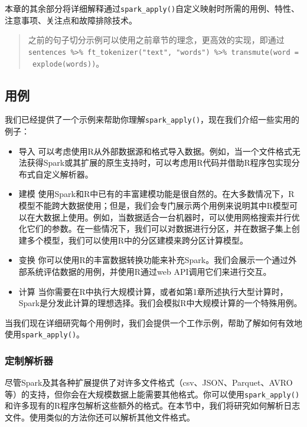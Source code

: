 \documentclass[
]{article}
\providecommand{\tightlist}{%
  \setlength{\itemsep}{0pt}\setlength{\parskip}{0pt}}
\begin{document}
本章的其余部分将详细解释通过\texttt{spark\_apply()}自定义映射时所需的用例、特性、注意事项、关注点和故障排除技术。

\begin{quote}
之前的句子切分示例可以使用之前章节的理念，更高效的实现，即通过\texttt{sentences\ \%\textgreater{}\%\ ft\_tokenizer("text",\ "words")\ \%\textgreater{}\%\ transmute(word\ =\ explode(words))}。
\end{quote}

\hypertarget{ux7528ux4f8b-1}{%
\subsection{用例}\label{ux7528ux4f8b-1}}

我们已经提供了一个示例来帮助你理解\texttt{spark\_apply()}，现在我们介绍一些实用的例子：

\begin{itemize}
\tightlist
\item
  导入
  可以考虑使用R从外部数据源和格式导入数据。例如，当一个文件格式无法获得Spark或其扩展的原生支持时，可以考虑用R代码并借助R程序包实现分布式自定义解析器。
\item
  建模
  使用Spark和R中已有的丰富建模功能是很自然的。在大多数情况下，R模型不能跨大数据使用；但是，我们会专门展示两个用例来说明其中R模型可以在大数据上使用。例如，当数据适合一台机器时，可以使用网格搜索并行优化它们的参数。在一些情况下，我们可以对数据进行分区，并在数据子集上创建多个模型，我们可以使用R中的分区建模来跨分区计算模型。
\item
  变换
  你可以使用R的丰富数据转换功能来补充Spark。我们会展示一个通过外部系统评估数据的用例，并使用R通过web
  API调用它们来进行交互。
\item
  计算
  当你需要在R中执行大规模计算，或者如第1章所述执行大型计算时，Spark是分发此计算的理想选择。我们会模拟R中大规模计算的一个特殊用例。
\end{itemize}

当我们现在详细研究每个用例时，我们会提供一个工作示例，帮助了解如何有效地使用\texttt{spark\_apply()}。

\hypertarget{ux5b9aux5236ux89e3ux6790ux5668}{%
\subsubsection{定制解析器}\label{ux5b9aux5236ux89e3ux6790ux5668}}

尽管Spark及其各种扩展提供了对许多文件格式（csv、JSON、Parquet、AVRO等）的支持，但你会在大规模数据上能需要其他格式。你可以使用\texttt{spark\_apply()}和许多现有的R程序包解析这些额外的格式。在本节中，我们将研究如何解析日志文件。使用类似的方法你还可以解析其他文件格式。
\end{document}

